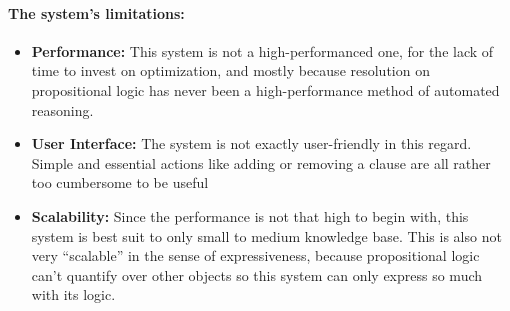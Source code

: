 \documentclass[../gr-final.tex]{subfiles}
\begin{document}
\paragraph{The system's limitations:}
\begin{itemize}
        \item {\bfseries Performance:} This system is not a high-performanced
                one, for the lack of time to invest on
                optimization, and mostly because resolution on
                propositional logic has never been a
                high-performance method of automated reasoning.
        \item {\bfseries User Interface:} The system is not exactly
                user-friendly in this regard. Simple and
                essential actions like adding or removing a
                clause are all rather too cumbersome to be useful
        \item {\bfseries Scalability:} Since the performance is not that high
                to begin with, this system is best suit to only
                small to medium knowledge base. This is also not
                very ``scalable'' in the sense of expressiveness,
                because propositional logic can't quantify over other objects 
                so this system can only express so much with its
                logic.                
\end{itemize}
\end{document}
